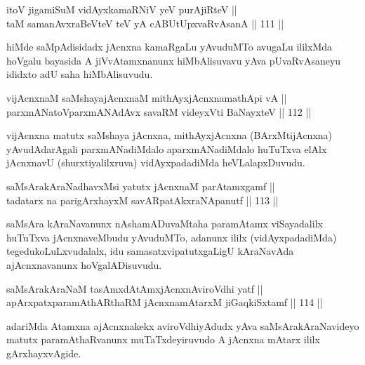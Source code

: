 
\begin{shl}
itoV jigamiSuM vidAyxkamaRNiV yeV purA\s jiRteV || \\
taM samanAvxraBeVteV teV yA cABUtUpxvaRvAsanA \hfill || 111 ||  
\end{shl}

\begin{artha}
hiMde saMpAdisidadx jAcnxna kamaRgaLu yAvuduMTo avugaLu ililxMda
hoVgalu bayasida A jiVvAtamxnanunx hiMbAlisuvavu yAva pUvaRvAsaneyu
ididxto adU saha hiMbAlisuvudu.
\end{artha}

\begin{shl}
vijAcnxnaM saMshayajAcnxnaM mithAyxjAcnxnamathApi vA || \\
parxmANatoV\s parxmANAdAvx savaRM videyxVti BaNayxteV \hfill || 112 ||  
\end{shl}

\begin{artha}
vijAcnxna matutx saMshaya jAcnxna, mithAyxjAcnxna (BArxMtijAcnxna)
yAvudAdarAgali parxmANadiMdalo aparxmANadiMdalo huTuTxva elAlx
jAcnxnavU (shurxtiyalilxruva) vidAyxpadadiMda heVLalapxDuvudu.
\end{artha}

\begin{shl}
saMsArakAraNadhavxMsi yatutx jAcnxnaM parAtamxgamf ||  \\
tadatarx na parigArxhayxM savARpatAkxraNApanutf \hfill || 113 ||  
\end{shl}

\begin{artha}
saMsAra kAraNavanunx nAshamADuvaMtaha paramAtamx viSayadalilx huTuTxva
jAcnxnaveMbudu yAvuduMTo, adanunx ililx (vidAyxpadadiMda)
tegedukoLuLxvudalalx, idu samasatxvipatutxgaLigU kAraNavAda
ajAcnxnavanunx hoVgalADisuvudu.
\end{artha}

\begin{shl}
saMsArakAraNaM tasAmxdAtAmxjAcnxnAviroVdhi yatf || \\
apArxpatxparamAthARthaRM jAcnxnamAtarxM jiGaqkiSxtamf \hfill || 114 ||  
\end{shl}

\begin{artha}
adariMda Atamxna ajAcnxnakekx aviroVdhiyAdudx yAva
saMsArakAraNavideyo matutx paramAthaRvanunx muTaTxdeyiruvudo A jAcnxna
mAtarx ililx gArxhayxvAgide.
\end{artha}

